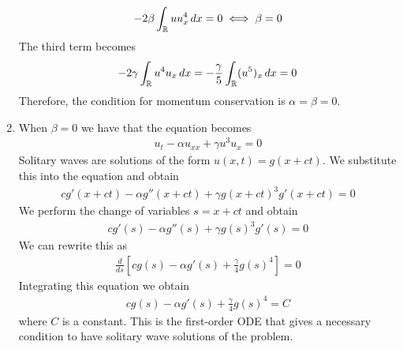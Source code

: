 \begin{enumerate}
          \[
              \begin{split}
                  -2\beta \int_{\mathbb{R}} u u_{x}^4 \, dx = 0 \iff \beta = 0
              \end{split}
          \]
          The third term becomes
          \[
              \begin{split}
                  -2\gamma \int_{\mathbb{R}} u^4u_x \, dx = -\frac{\gamma}{5} \int_{\mathbb{R}} (u^5)_x \, dx = 0
              \end{split}
          \]
          Therefore, the condition for momentum conservation is \(\alpha = \beta = 0\).
    \item When \(\beta = 0\) we have that the equation becomes
          \[
              \begin{split}
                  u_{t} - \alpha u_{xx} + \gamma u^3u_x = 0
              \end{split}
          \]
          Solitary waves are solutions of the form \(u(x,t) = g(x + ct)\). We substitute
          this into the equation and obtain
          \[
              \begin{split}
                  cg'(x + ct) - \alpha g''(x + ct) + \gamma g(x + ct)^3g'(x + ct) = 0
              \end{split}
          \]
          We perform the change of variables \(s = x + ct\) and obtain
          \[
              \begin{split}
                  cg'(s) - \alpha g''(s) + \gamma g(s)^3g'(s) = 0
              \end{split}
          \]
          We can rewrite this as
          \[
              \begin{split}
                  \frac{d}{ds} \left[ cg(s) - \alpha g'(s) + \frac{\gamma}{4} g(s)^4 \right] = 0
              \end{split}
          \]
          Integrating this equation we obtain
          \[
              \begin{split}
                  cg(s) - \alpha g'(s) + \frac{\gamma}{4} g(s)^4 = C
              \end{split}
          \]
          where \(C\) is a constant. This is the first-order ODE that gives a necessary
          condition to have solitary wave solutions of the problem.
\end{enumerate}


